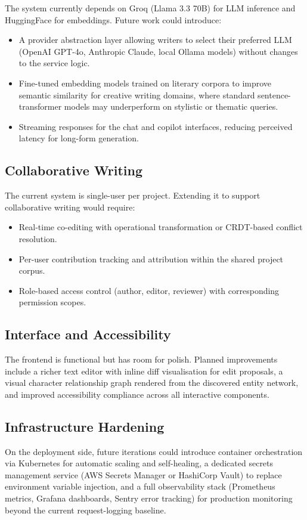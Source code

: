 The system currently depends on Groq (Llama 3.3 70B) for LLM inference and HuggingFace for embeddings. Future work could introduce:

\begin{itemize}
    \item A provider abstraction layer allowing writers to select their preferred LLM (OpenAI GPT-4o, Anthropic Claude, local Ollama models) without changes to the service logic.
    \item Fine-tuned embedding models trained on literary corpora to improve semantic similarity for creative writing domains, where standard sentence-transformer models may underperform on stylistic or thematic queries.
    \item Streaming responses for the chat and copilot interfaces, reducing perceived latency for long-form generation.
\end{itemize}

\subsection{Collaborative Writing}

The current system is single-user per project. Extending it to support collaborative writing would require:

\begin{itemize}
    \item Real-time co-editing with operational transformation or CRDT-based conflict resolution.
    \item Per-user contribution tracking and attribution within the shared project corpus.
    \item Role-based access control (author, editor, reviewer) with corresponding permission scopes.
\end{itemize}

\subsection{Interface and Accessibility}

The frontend is functional but has room for polish. Planned improvements include a richer text editor with inline diff visualisation for edit proposals, a visual character relationship graph rendered from the discovered entity network, and improved accessibility compliance across all interactive components.

\subsection{Infrastructure Hardening}

On the deployment side, future iterations could introduce container orchestration via Kubernetes for automatic scaling and self-healing, a dedicated secrets management service (AWS Secrets Manager or HashiCorp Vault) to replace environment variable injection, and a full observability stack (Prometheus metrics, Grafana dashboards, Sentry error tracking) for production monitoring beyond the current request-logging baseline.

